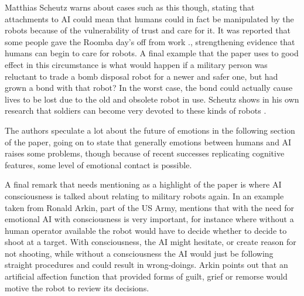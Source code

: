 \documentclass[article]{IEEEtran}
\begin{document}
Matthias Scheutz warns about cases such as this though, stating that attachments to AI could mean that humans could in fact be manipulated by the robots because of the vulnerability of trust and care for it. It was reported that some people gave the Roomba day’s off from work \cite{ethicsMilitary}., strengthening evidence that humans can begin to care for robots. A final example that the paper uses to good effect in this circumstance is what would happen if a military person was reluctant to trade a bomb disposal robot for a newer and safer one, but had grown a bond with that robot? In the worst case, the bond could actually cause lives to be lost due to the old and obsolete robot in use. Scheutz shows in his own research that soldiers can become very devoted to these kinds of robots \cite{ethicsMilitary}. \par
The authors speculate a lot about the future of emotions in the following section of the paper, going on to state that generally emotions between humans and AI raises some problems, though because of recent successes replicating cognitive features, some level of emotional contact is possible. \par
A final remark that needs mentioning as a highlight of the paper is where AI consciousness is talked about relating to military robots again. In an example taken from Ronald Arkin, part of the US Army, mentions that with the need for emotional AI with consciousness is very important, for instance where without a human operator available the robot would have to decide whether to decide to shoot at a target. With consciousness, the AI might hesitate, or create reason for not shooting, while without a consciousness the AI would just be following straight procedures and could result in wrong-doings. Arkin points out that an artificial affection function that provided forms of guilt, grief or remorse would motive the robot to review its decisions. 
\end{document}
